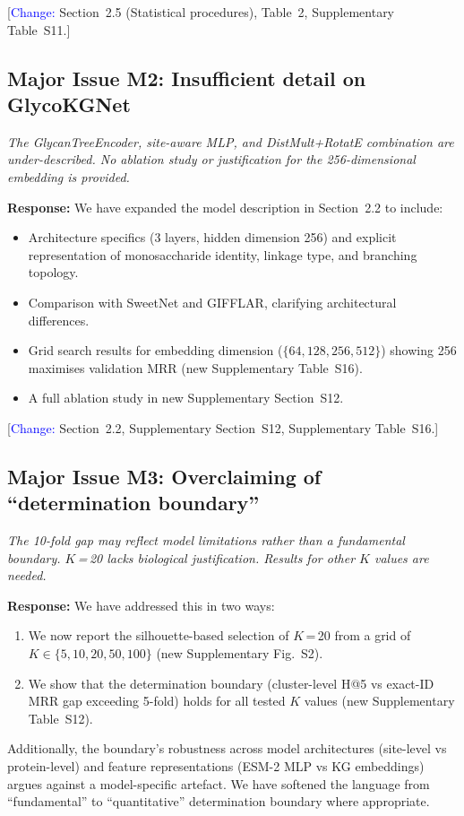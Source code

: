 \documentclass[11pt,a4paper]{article}
\newcommand{\reviewercomment}[1]{\textit{\color{black!70}#1}}
\newcommand{\response}[1]{\textbf{Response:} #1}
\newcommand{\change}[1]{[\textcolor{blue}{Change:} #1]}
\begin{document}
\change{Section~2.5 (Statistical procedures), Table~2, Supplementary Table~S11.}

\subsection*{Major Issue M2: Insufficient detail on GlycoKGNet}

\reviewercomment{The GlycanTreeEncoder, site-aware MLP, and DistMult+RotatE
combination are under-described. No ablation study or justification for the
256-dimensional embedding is provided.}

\response{We have expanded the model description in Section~2.2 to include:
\begin{itemize}[nosep]
  \item Architecture specifics (3 layers, hidden dimension 256) and explicit
        representation of monosaccharide identity, linkage type, and branching
        topology.
  \item Comparison with SweetNet and GIFFLAR, clarifying architectural
        differences.
  \item Grid search results for embedding dimension ($\{64, 128, 256, 512\}$)
        showing 256 maximises validation MRR (new Supplementary Table~S16).
  \item A full ablation study in new Supplementary Section~S12.
\end{itemize}}

\change{Section~2.2, Supplementary Section~S12, Supplementary Table~S16.}

\subsection*{Major Issue M3: Overclaiming of ``determination boundary''}

\reviewercomment{The 10-fold gap may reflect model limitations rather than a
fundamental boundary. $K$\,=\,20 lacks biological justification. Results for
other $K$ values are needed.}

\response{We have addressed this in two ways:
\begin{enumerate}[nosep]
  \item We now report the silhouette-based selection of $K$\,=\,20 from a grid
        of $K \in \{5, 10, 20, 50, 100\}$ (new Supplementary Fig.~S2).
  \item We show that the determination boundary (cluster-level H@5 vs exact-ID
        MRR gap exceeding 5-fold) holds for all tested $K$ values (new
        Supplementary Table~S12).
\end{enumerate}
Additionally, the boundary's robustness across model architectures (site-level
vs protein-level) and feature representations (ESM-2 MLP vs KG embeddings)
argues against a model-specific artefact. We have softened the language from
``fundamental'' to ``quantitative'' determination boundary where appropriate.}
\end{document}
